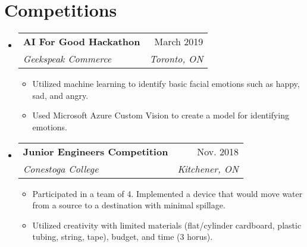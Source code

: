 \documentclass[letterpaper,11pt]{article}
\makeatletter
\newcommand{\resumeItem}[1]{
  \item\small{
    {#1 \vspace{-2pt}}
  }
}
\newcommand{\resumeSubheading}[4]{
  \vspace{-2pt}\item
    \begin{tabular*}{0.97\textwidth}[t]{l@{\extracolsep{\fill}}r}
      \textbf{#1} & #2 \\
      \textit{\small#3} & \textit{\small #4} \\
    \end{tabular*}\vspace{-7pt}
}
\newcommand{\resumeSubHeadingListStart}{\begin{itemize}[leftmargin=0.15in, label={}]}
\newcommand{\resumeSubHeadingListEnd}{\end{itemize}}
\newcommand{\resumeItemListStart}{\begin{itemize}}
\newcommand{\resumeItemListEnd}{\end{itemize}\vspace{-5pt}}
\makeatother
\begin{document}
\section{Competitions}
    \resumeSubHeadingListStart
        \resumeSubheading
        {AI For Good Hackathon}{March 2019}
        {Geekspeak Commerce}{Toronto, ON}
          \resumeItemListStart
            \resumeItem{Utilized machine learning to identify basic facial emotions such as happy, sad, and angry.}
            \resumeItem{Used Microsoft Azure Custom Vision to create a model for identifying emotions.}
          \resumeItemListEnd

          \resumeSubheading
          {Junior Engineers Competition}{Nov. 2018}
          {Conestoga College}{Kitchener, ON}
          \resumeItemListStart
            \resumeItem{Participated in a team of 4. Implemented a device that would move water from a source to a destination with minimal spillage.}
            \resumeItem{Utilized creativity with limited materials (flat/cylinder cardboard, plastic tubing, string, tape), budget, and time (3 horus).}
          \resumeItemListEnd
    \resumeSubHeadingListEnd
\end{document}

